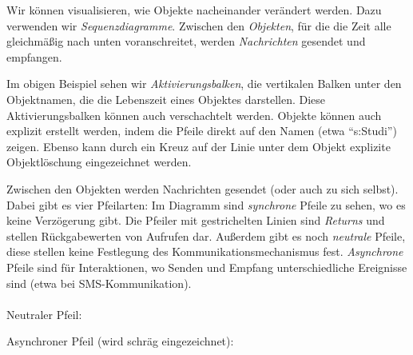 \documentclass{panikzettel}
\begin{document}
Wir können visualisieren, wie Objekte nacheinander verändert werden.
Dazu verwenden wir \emph{Sequenzdiagramme}.
Zwischen den \emph{Objekten}, für die die Zeit alle gleichmäßig nach unten voranschreitet, werden \emph{Nachrichten} gesendet und empfangen.


Im obigen Beispiel sehen wir \emph{Aktivierungsbalken}, die vertikalen Balken unter den Objektnamen, die die Lebenszeit eines Objektes darstellen.
Diese Aktivierungsbalken können auch verschachtelt werden.
Objekte können auch explizit erstellt werden, indem die Pfeile direkt auf den Namen (etwa ``s:Studi'') zeigen.
Ebenso kann durch ein Kreuz auf der Linie unter dem Objekt explizite Objektlöschung eingezeichnet werden.

Zwischen den Objekten werden Nachrichten gesendet (oder auch zu sich selbst).
Dabei gibt es vier Pfeilarten: Im Diagramm sind \emph{synchrone} Pfeile zu sehen, wo es keine Verzögerung gibt.
Die Pfeiler mit gestrichelten Linien sind \emph{Returns} und stellen Rückgabewerten von Aufrufen dar.
Außerdem gibt es noch \emph{neutrale} Pfeile, diese stellen keine Festlegung des Kommunikationsmechanismus fest.
\emph{Asynchrone} Pfeile sind für Interaktionen, wo Senden und Empfang unterschiedliche Ereignisse sind (etwa bei SMS-Kommunikation).
~\\~\\
Neutraler Pfeil: 

Asynchroner Pfeil (wird schräg eingezeichnet): 
\end{document}

